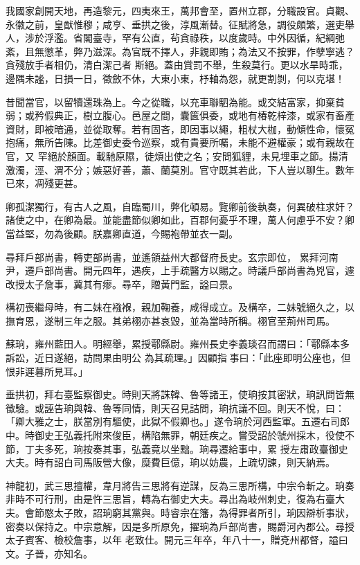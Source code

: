\begin{pinyinscope}
 我國家創開天地，再造黎元，四夷來王，萬邦會至，置州立郡，分職設官。貞觀、永徽之前，皇猷惟穆；咸亨、垂拱之後，淳風漸替。征賦將急，調役頗繁，選吏舉人，涉於浮濫。省閣臺寺，罕有公直，茍貪祿秩，以度歲時。中外因循，紀綱弛紊，且無懲革，弊乃滋深。為官既不擇人，非親即賄；為法又不按罪，作孽寧逃？貪殘放手者相仍，清白潔己者
 斯絕。蓋由賞罰不舉，生殺莫行。更以水旱時乖，邊隅未謐，日損一日，徵斂不休，大東小東，杼軸為怨，就更割剝，何以克堪！



 昔聞當官，以留犢還珠為上。今之從職，以充車聯駟為能。或交結富家，抑棄貧弱；或矜假典正，樹立腹心。邑屋之間，囊篋俱委，或地有椿乾梓漆，或家有畜產資財，即被暗通，並從取奪。若有固吝，即因事以繩，粗杖大枷，動傾性命，懷冤抱痛，無所告陳。比差御史委令巡察，或有貴要所囑，未能不避權豪；或有親故在官，又
 罕絕於顏面。載馳原隰，徒煩出使之名；安問狐貍，未見埋車之節。揚清激濁，涇、渭不分；嫉惡好善，蕭、蘭莫別。官守既其若此，下人豈以聊生。數年已來，凋殘更甚。



 卿孤潔獨行，有古人之風，自臨蜀川，弊化頓易。覽卿前後執奏，何異破柱求奸？諸使之中，在卿為最。並能盡節似卿如此，百郡何憂乎不理，萬人何慮乎不安？卿當益堅，勿為後顧。朕嘉卿直道，今賜袍帶並衣一副。



 尋拜戶部尚書，轉吏部尚書，並遙領益州大都督府長史。玄宗即位，
 累拜河南尹，遷戶部尚書。開元四年，遇疾，上手疏醫方以賜之。時議戶部尚書為兇官，遽改授太子詹事，冀其有瘳。尋卒，贈黃門監，謚曰景。



 構初喪繼母時，有二妹在襁褓，親加鞠養，咸得成立。及構卒，二妹號絕久之，以撫育恩，遂制三年之服。其弟栩亦甚哀毀，並為當時所稱。栩官至荊州司馬。



 蘇珦，雍州藍田人。明經舉，累授鄠縣尉。雍州長史李義琰召而謂曰：「鄠縣本多訴訟，近日遂絕，訪問果由明公
 為其疏理。」因顧指事曰：「此座即明公座也，但恨非遲暮所見耳。」



 垂拱初，拜右臺監察御史。時則天將誅韓、魯等諸王，使珦按其密狀，珦訊問皆無徵驗。或誣告珦與韓、魯等同情，則天召見詰問，珦抗議不回。則天不悅，曰：「卿大雅之士，朕當別有驅使，此獄不假卿也。」遂令珦於河西監軍。五遷右司郎中。時御史王弘義托附來俊臣，構陷無罪，朝廷疾之。嘗受詔於虢州採木，役使不節，丁夫多死，珦按奏其事，弘義竟以坐黜。珦尋遷給事中，累
 授左肅政臺御史大夫。時有詔白司馬阪營大像，糜費巨億，珦以妨農，上疏切諫，則天納焉。



 神龍初，武三思擅權，韋月將告三思將有逆謀，反為三思所構，中宗令斬之。珦奏非時不可行刑，由是忤三思旨，轉為右御史大夫。尋出為岐州刺史，復為右臺大夫。會節愍太子敗，詔珦窮其黨與。時睿宗在籓，為得罪者所引，珦因辯析事狀，密奏以保持之。中宗意解，因是多所原免，擢珦為戶部尚書，賜爵河內郡公。尋授太子賓客、檢校詹事，以年
 老致仕。開元三年卒，年八十一，贈兗州都督，謚曰文。子晉，亦知名。




\end{pinyinscope}
